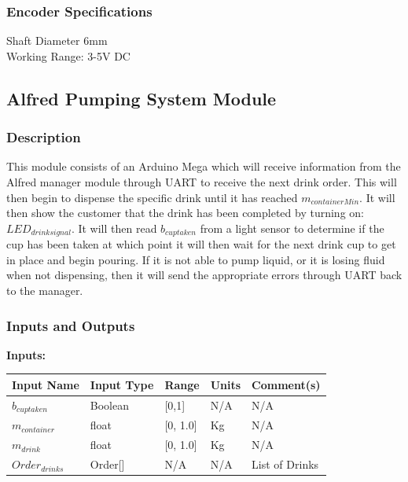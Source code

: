 \documentclass [10pt]{article}
\begin{document}
\subsubsection{Encoder Specifications}
Shaft Diameter 6mm\\
Working Range: 3-5V DC\\


\subsection{Alfred Pumping System Module}


\subsubsection{Description}
This module consists of an Arduino Mega which will receive information from the Alfred manager module through UART to receive the next drink order. This will then begin to dispense the specific drink until it has reached $ m_{containerMin} $. It will then show the customer that the drink has been completed by turning on: $ LED_{drinksignal} $. It will then read $ b_{cuptaken} $ from a light sensor to determine if the cup has been taken at which point it will then wait for the next drink cup to get in place and begin pouring. If it is not able to pump liquid, or it is losing fluid when not dispensing, then it will send the appropriate errors through UART back to the manager.


\subsubsection{Inputs and Outputs}

\textbf{Inputs: } \\

\begin{longtable}{|l|l|l|l|l|}\hline 
		\rowcolor{tableCell}\textbf{Input Name} & \textbf{Input Type} & \textbf{Range} & \textbf{Units} & \textbf{Comment(s)} \\ \hline
		$ b_{cuptaken} $ & Boolean & [0,1] & N/A &  N/A\\ \hline
		\rowcolor{tableCell}$ m_{container} $ & float & [0, 1.0]& Kg & N/A\\ \hline
		$ m_{drink} $    & float & [0, 1.0] & Kg &  N/A\\ \hline
		\rowcolor{tableCell}$ Order_{drinks} $ & Order[] & N/A  & N/A & List of Drinks  \\ \hline
\end{longtable}
\end{document}
